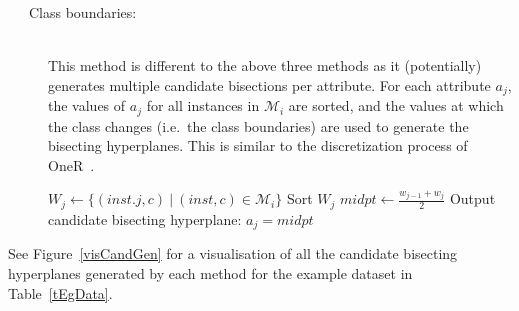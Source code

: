 \documentclass[a4paper,12pt]{article} %
\newcommand{\mcl}[1]{\mathcal{#1}}
\begin{document}
\begin{description}
\item[~~~Class boundaries:]  \ \\
    This method is different to the above three methods
        as it (potentially) generates multiple candidate bisections 
        per attribute.
    For each attribute $a_j$, 
        the values of $a_j$ for all instances in $\mcl{M}_i$ are sorted,
        and the values at which the class changes (i.e.\ the class boundaries)
        are used to generate the bisecting hyperplanes.
    This is similar to the discretization process of OneR~\cite{holte}.
    \begin{algorithmic}
        \State $W_j \gets \{ (inst.j,c) ~\big|~ (inst,c) \in \mcl{M}_i \}$
        \State Sort $W_j$
            \State $midpt \gets \frac{w_{j-1}+w_j}{2}$
            \State Output candidate bisecting hyperplane: $a_j = midpt$
        \EndFor
    \EndFor
    \end{algorithmic}
\end{description}

See Figure~\ref{visCandGen} for a visualisation of all the 
    candidate bisecting hyperplanes generated by each method
    for the example dataset in Table~\ref{tEgData}.

\FloatBarrier
\end{document}
